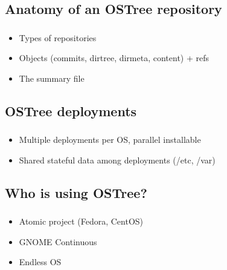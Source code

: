 \subsection{Anatomy of an OSTree repository}
\begin{frame}
  \frametitle{\insertsubsection}

    \begin{itemize}
      \item Types of repositories\vspacing
      \item Objects (commits, dirtree, dirmeta, content) + refs\vspacing
      \item The summary file\vspacing
    \end{itemize}
\end{frame}

\subsection{OSTree deployments}
\begin{frame}
  \frametitle{\insertsubsection}

    \begin{itemize}
      \item Multiple deployments per OS, parallel installable\vspacing
      \item Shared stateful data among deployments (/etc, /var)\vspacing
    \end{itemize}
\end{frame}

\subsection{Who is using OSTree?}
\begin{frame}
  \frametitle{\insertsubsection}

    \begin{itemize}
      \item Atomic project (Fedora, CentOS)\vspacing
      \item GNOME Continuous\vspacing
      \item Endless OS\vspacing
    \end{itemize}
\end{frame}
